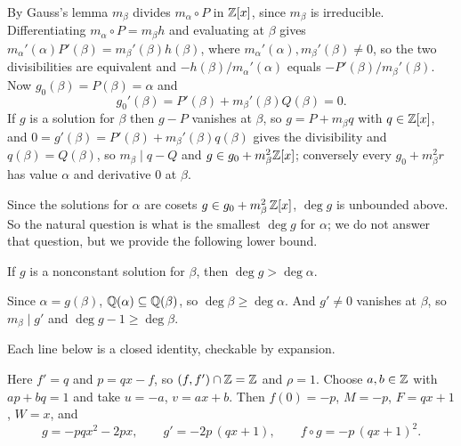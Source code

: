 \begin{pf}
  By Gauss's lemma $m_{\beta}$ divides $m_{\alpha} \circ P$ in $\mathbb{Z}[x]$, since
  $m_{\beta}$ is irreducible. Differentiating $m_{\alpha} \circ P = m_{\beta}h$
  and evaluating at $\beta$ gives
  $m_{\alpha}'(\alpha)P'(\beta) = m_{\beta}'(\beta)h(\beta)$, where
  $m_{\alpha}'(\alpha), m_{\beta}'(\beta) \neq 0$, so the two
  divisibilities are equivalent and $-h(\beta)/m_{\alpha}'(\alpha)$ equals
  $-P'(\beta)/m_{\beta}'(\beta)$. Now $g_{0}(\beta) = P(\beta) = \alpha$ and
  \[
    g_{0}'(\beta) = P'(\beta) + m_{\beta}'(\beta)Q(\beta) = 0 .
  \]
  If $g$ is a solution for $\beta$ then $g - P$ vanishes at $\beta$, so
  $g = P + m_{\beta}q$ with $q \in \mathbb{Z}[x]$, and
  $0 = g'(\beta) = P'(\beta) + m_{\beta}'(\beta)q(\beta)$ gives the
  divisibility and $q(\beta) = Q(\beta)$, so $m_{\beta} \mid q - Q$ and
  $g \in g_{0} + m_{\beta}^{2}\mathbb{Z}[x]$; conversely every $g_{0} + m_{\beta}^{2}r$
  has value $\alpha$ and derivative $0$ at $\beta$.
\end{pf}


Since the solutions for $\alpha$ are cosets $g \in g_{0} + m_{\beta}^{2}\,\mathbb{Z}[x]$,
$\deg g$ is unbounded above. So the natural question is what is the
smallest $\deg g$ for $\alpha$; we do not answer that question, but we provide the
following lower bound.

\begin{prop}\label{Pdeg}
  If $g$ is a nonconstant solution for $\beta$, then $\deg g > \deg \alpha$.
\end{prop}

\begin{pf}
  Since $\alpha = g(\beta)$, $\mathbb{Q}(\alpha) \subseteq \mathbb{Q}(\beta)$, so
  $\deg \beta \geq \deg \alpha$. And $g' \neq 0$ vanishes at $\beta$, so
  $m_{\beta} \mid g'$ and $\deg g - 1 \geq \deg \beta$.
\end{pf}

Each line below is a closed identity, checkable by expansion.

\begin{example}[$f = qx - p$, $p \neq 0$, $\gcd(p,q) = 1$]
  Here $f' = q$ and $p = qx - f$, so $(f,f') \cap \mathbb{Z} = \mathbb{Z}$ and $\rho = 1$.
  Choose $a, b \in \mathbb{Z}$ with $ap + bq = 1$ and take $u = -a$, $v = ax + b$. Then
  $f(0) = -p$, $M = -p$, $F = qx + 1$, $W = x$, and
  \[
    g = -pqx^{2} - 2px, \qquad
    g' = -2p\,(qx+1), \qquad
    f \circ g = -p\,(qx+1)^{2}.
  \]
\end{example}

